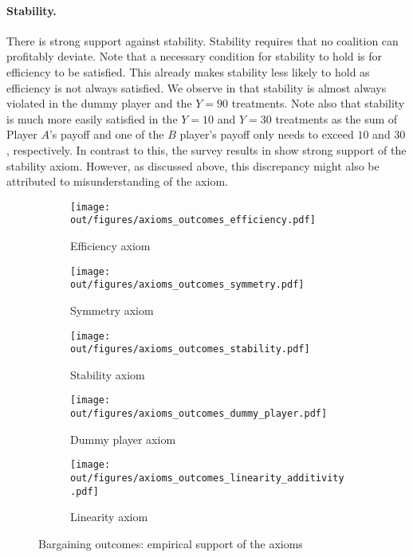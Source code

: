 \paragraph{Stability.}
There is strong support against stability. Stability requires that no coalition can profitably deviate. Note that a necessary condition for stability to hold is for efficiency to be satisfied. This already makes stability less likely to hold as efficiency is not always satisfied. We observe in  that stability is almost always violated in the dummy player and the $Y=90$ treatments. Note also that stability is much more easily satisfied in the $Y=10$ and $Y=30$ treatments as the sum of Player $A$'s payoff and one of the $B$ player's payoff only needs to exceed $10$ and $30$, respectively.
In contrast to this, the survey results in  show strong support of the stability axiom. However, as discussed above, this discrepancy might also be attributed to misunderstanding of the axiom.

\begin{figure}
    \centering
    \begin{subfigure}[T]{0.45\textwidth}
        \centering
        \texttt{[image: out/figures/axioms\_outcomes\_efficiency.pdf]}
        \caption{Efficiency axiom}
        \label{fig:axioms_outcomes_efficiency}
    \end{subfigure}
    \hfill
    \begin{subfigure}[T]{0.45\textwidth}
        \centering
        \texttt{[image: out/figures/axioms\_outcomes\_symmetry.pdf]}
        \caption{Symmetry axiom}
        \label{fig:axioms_outcomes_symmetry}
    \end{subfigure}
    \vfill
    \begin{subfigure}[T]{0.45\textwidth}
        \centering
        \texttt{[image: out/figures/axioms\_outcomes\_stability.pdf]}
        \caption{Stability axiom}
        \label{fig:axioms_outcomes_stability}
    \end{subfigure}
    \hfill
    \begin{subfigure}[T]{0.45\textwidth}
         \centering
        \texttt{[image: out/figures/axioms\_outcomes\_dummy\_player.pdf]}
        \caption{Dummy player axiom}
        \label{fig:axioms_outcomes_dummy}
    \end{subfigure}
    \vfill
    \begin{subfigure}[b]{\textwidth}
        \centering
        \texttt{[image: out/figures/axioms\_outcomes\_linearity\_additivity.pdf]}
        \caption{Linearity axiom}
        \label{fig:axioms_outcomes_linearity}
    \end{subfigure}
    \caption{Bargaining outcomes: empirical support of the axioms}
    \label{fig:axioms_outcomes}
\end{figure}

